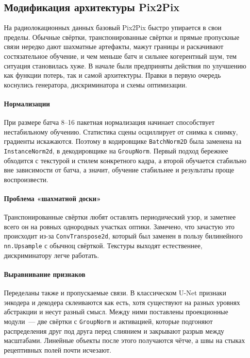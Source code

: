 \subsection{Модификация архитектуры Pix2Pix}
\label{subsec:pix2pix_modifications}

На радиолокационных данных базовый Pix2Pix быстро упирается в свои пределы.
Обычные свёртки, транспонированные свёртки и прямые пропускные связи нередко дают шахматные артефакты, мажут границы и раскачивают состязательное обучение, и чем меньше батч и сильнее когерентный шум, тем ситуация становилась хуже.
В начале были предприняты действия по улучшению как функции потерь, так и самой архитектуры.
Правки в первую очередь коснулись генератора, дискриминатора и схемы оптимизации.

\paragraph{Нормализации}
При размере батча 8--16 пакетная нормализация начинает способствует нестабильному обучению. Статистика сцены осциллирует от снимка к снимку, градиенты искажаются.
Поэтому в кодировщике \texttt{BatchNorm2D} была заменена на \texttt{InstanceNorm2d}, в декодировщике на \texttt{GroupNorm}.
Первый подход бережнее обходится с текстурой и стилем конкретного кадра, а второй обучается стабильно вне зависимости от батча, а значит, обучение стабильнее и результаты проще воспроизвести.

\paragraph{Проблема «шахматной доски»}
Транспонированные свёртки любят оставлять периодический узор, и заметнее всего он на ровных однородных участках оптики.
Замечено, что зачастую это происходит из-за \texttt{ConvTranspose2d}, который был заменен в пользу билинейного \texttt{nn.Upsample} с обычноц свёрткой.
Текстуры выходят естественнее, дискриминатору легче работать.

\paragraph{Выравнивание признаков}
Переделаны также и пропускаемые связи.
В классическом U-Net признаки энкодера и декодера склеиваются как есть, хотя существуют на разных уровнях абстракции и несут разный смысл.
Между ними поставлены проекционные модули~--- две свёртки с \texttt{GroupNorm} и активацией, которые подгоняют распределения друг под друга перед слиянием и закрывают разрыв между масштабами.
Линейные объекты после этого получаются чётче, а швы на стыках рецептивных полей почти исчезают.

